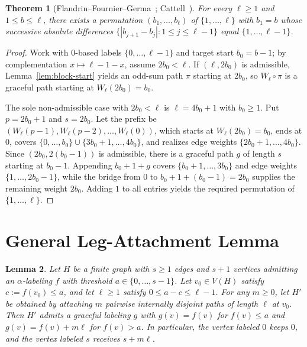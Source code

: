 \documentclass[11pt]{article}
\newtheorem{theorem}{Theorem}[section]
\newtheorem{lemma}[theorem]{Lemma}
\begin{document}
\begin{theorem}[Flandrin--Fournier--Germa~\cite{FFG1983}; Cattell~\cite{Cattell2007}]\label{thm:start}
For every $\ell \ge 1$ and $1 \le b \le \ell$, there exists a permutation $(b_1, \dots, b_\ell)$ of $\{1, \dots, \ell\}$ with $b_1 = b$ whose successive absolute differences $\{|b_{j+1} - b_j| : 1 \le j \le \ell - 1\}$ equal $\{1, \dots, \ell - 1\}$.
\end{theorem}

\begin{proof}
Work with $0$-based labels $\{0, \dots, \ell - 1\}$ and target start $b_0 = b - 1$; by complementation $x \mapsto \ell - 1 - x$, assume $2b_0 < \ell$. If $(\ell, 2b_0)$ is admissible, Lemma~\ref{lem:block-start} yields an odd-sum path $\pi$ starting at $2b_0$, so $W_\ell \circ \pi$ is a graceful path starting at $W_\ell(2b_0) = b_0$.

The sole non-admissible case with $2b_0 < \ell$ is $\ell = 4b_0 + 1$ with $b_0 \ge 1$. Put $p = 2b_0 + 1$ and $s = 2b_0$. Let the prefix be $(W_\ell(p - 1), W_\ell(p - 2), \dots, W_\ell(0))$, which starts at $W_\ell(2b_0) = b_0$, ends at $0$, covers $\{0, \dots, b_0\} \cup \{3b_0 + 1, \dots, 4b_0\}$, and realizes edge weights $\{2b_0 + 1, \dots, 4b_0\}$. Since $(2b_0, 2(b_0 - 1))$ is admissible, there is a graceful path $g$ of length $s$ starting at $b_0 - 1$. Appending $b_0 + 1 + g$ covers $\{b_0 + 1, \dots, 3b_0\}$ and edge weights $\{1, \dots, 2b_0 - 1\}$, while the bridge from $0$ to $b_0 + 1 + (b_0 - 1) = 2b_0$ supplies the remaining weight $2b_0$. Adding $1$ to all entries yields the required permutation of $\{1, \dots, \ell\}$.
\end{proof}

\section{General Leg-Attachment Lemma}\label{sec:attach}

\begin{lemma}\label{lem:attach}
Let $H$ be a finite graph with $s \ge 1$ edges and $s + 1$ vertices admitting an $\alpha$-labeling $f$ with threshold $a \in \{0, \dots, s - 1\}$. Let $v_0 \in V(H)$ satisfy $c := f(v_0) \le a$, and let $\ell \ge 1$ satisfy $0 \le a - c \le \ell - 1$. For any $m \ge 0$, let $H'$ be obtained by attaching $m$ pairwise internally disjoint paths of length $\ell$ at $v_0$. Then $H'$ admits a graceful labeling $g$ with $g(v) = f(v)$ for $f(v) \le a$ and $g(v) = f(v) + m\ell$ for $f(v) > a$. In particular, the vertex labeled $0$ keeps $0$, and the vertex labeled $s$ receives $s + m\ell$.
\end{lemma}
\end{document}
